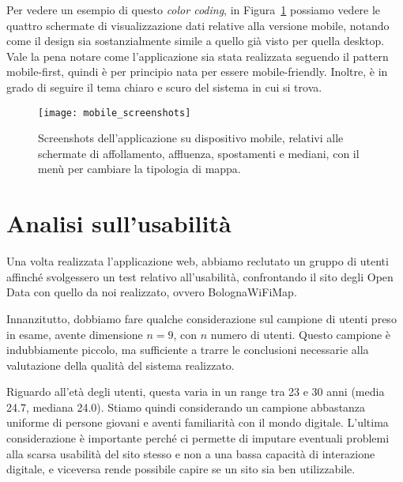 Per vedere un esempio di questo \textit{color coding}, in Figura~\ref{fig:mobile} possiamo vedere le quattro schermate di visualizzazione dati relative alla versione mobile, notando come il design sia sostanzialmente simile a quello già visto per quella desktop.
Vale la pena notare come l'applicazione sia stata realizzata seguendo il pattern mobile-first, quindi è per principio nata per essere mobile-friendly. Inoltre, è in grado di seguire il tema chiaro e scuro del sistema in cui si trova.

\begin{figure}[H]
    \centering
    \texttt{[image: mobile\_screenshots]}
    \caption[Screenshots su mobile]{Screenshots dell'applicazione su dispositivo mobile, relativi alle schermate di affollamento, affluenza, spostamenti e mediani, con il menù per cambiare la tipologia di mappa.}
    \label{fig:mobile}
\end{figure}

\section{Analisi sull'usabilità}


Una volta realizzata l'applicazione web, abbiamo reclutato un gruppo di utenti affinché svolgessero un test relativo all'usabilità, confrontando il sito degli Open Data con quello da noi realizzato, ovvero BolognaWiFiMap.

Innanzitutto, dobbiamo fare qualche considerazione sul campione di utenti preso in esame, avente dimensione \( n = 9 \), con \( n \) numero di utenti. Questo campione è indubbiamente piccolo, ma sufficiente a trarre le conclusioni necessarie alla valutazione della qualità del sistema realizzato.

Riguardo all'età degli utenti, questa varia in un range tra 23 e 30 anni (media 24.7, mediana 24.0). Stiamo quindi considerando un campione abbastanza uniforme di persone giovani e aventi familiarità con il mondo digitale. L'ultima considerazione è importante perché ci permette di imputare eventuali problemi alla scarsa usabilità del sito stesso e non a una bassa capacità di interazione digitale, e viceversa rende possibile capire se un sito sia ben utilizzabile.

